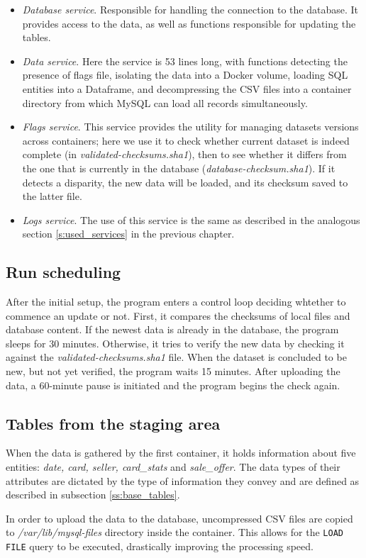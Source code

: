 \begin{itemize}
    \item \textit{Database service}.
          Responsible for handling the connection to the database. It provides access to the data, as well as functions responsible for updating the tables.

    \item \textit{Data service}.
          Here the service is 53 lines long, with functions detecting the presence of flags file, isolating the data into a Docker volume, loading SQL entities into a Dataframe, and decompressing the CSV files into a container directory from which MySQL can load all records simultaneously.

    \item \textit{Flags service}.
          This service provides the utility for managing datasets versions across containers; here we use it to check whether current dataset is indeed complete (in \textit{validated-checksums.sha1}), then to see whether it differs from the one that is currently in the database (\textit{database-checksum.sha1}). If it detects a disparity, the new data will be loaded, and its checksum saved to the latter file.

    \item \textit{Logs service}.
          The use of this service is the same as described in the analogous section \ref{s:used_services} in the previous chapter.
\end{itemize}

\subsection{Run scheduling}
After the initial setup, the program enters a control loop deciding whtether to commence an update or not. First, it compares the checksums of local files and database content. If the newest data is already in the database, the program sleeps for 30 minutes. Otherwise, it tries to verify the new data by checking it against the \textit{validated-checksums.sha1} file. When the dataset is concluded to be new, but not yet verified, the program waits 15 minutes. After uploading the data, a 60-minute pause is initiated and the program begins the check again.

\subsection{Tables from the staging area}
When the data is gathered by the first container, it holds information about five entities: \textit{date, card, seller, card\_stats} and \textit{sale\_offer}. The data types of their attributes are dictated by the type of information they convey and are defined as described in subsection \ref{ss:base_tables}. \par
In order to upload the data to the database, uncompressed CSV files are copied to \textit{/var/lib/mysql-files} directory inside the container. This allows for the \texttt{LOAD FILE} query to be executed, drastically improving the processing speed.


